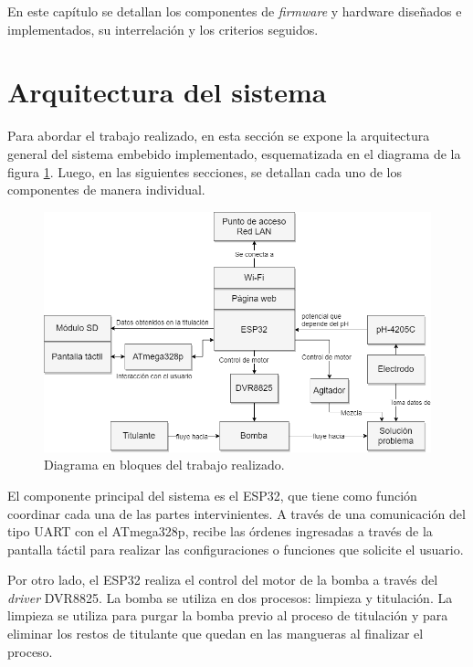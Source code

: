 En este capítulo se detallan los componentes de \textit{firmware} y hardware diseñados e implementados, su interrelación y los criterios seguidos.

\section{Arquitectura del sistema}

Para abordar el trabajo realizado, en esta sección se expone la arquitectura general del sistema embebido implementado, esquematizada en el diagrama de la figura \ref{fig:diagramaCompleto}. Luego, en las siguientes secciones, se detallan cada uno de los componentes de manera individual.

\begin{figure}[htbp]
	\centering
	\includegraphics[width=1.0\textwidth]{./Figures/DiagramaBloquesCompleto.png}
	\caption{Diagrama en bloques del trabajo realizado.}
	\label{fig:diagramaCompleto}
\end{figure}

El componente principal del sistema es el ESP32, que tiene como función coordinar cada una de las partes intervinientes. A través de una comunicación del tipo UART con el ATmega328p, recibe las órdenes ingresadas a través de la pantalla táctil para realizar las configuraciones o funciones que solicite el usuario.

Por otro lado, el ESP32 realiza el control del motor de la bomba a través del \textit{driver} DVR8825. La bomba se utiliza en dos procesos: limpieza y titulación. La limpieza se utiliza para purgar la bomba previo al proceso de titulación y para eliminar los restos de titulante que quedan en las mangueras al finalizar el proceso.

